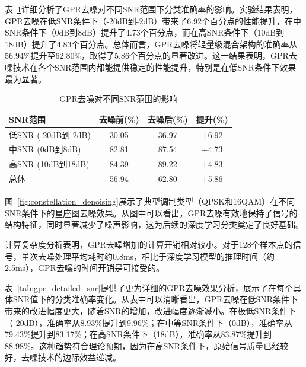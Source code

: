 \documentclass[conference]{IEEEtran}
\begin{document}
表~\ref{tab:gpr_impact}详细分析了GPR去噪对不同SNR范围下分类准确率的影响。实验结果表明，GPR去噪在低SNR条件下（-20dB到-2dB）带来了6.92个百分点的性能提升，在中SNR条件下（0dB到8dB）提升了4.73个百分点，而在高SNR条件下（10dB到18dB）提升了4.83个百分点。总体而言，GPR去噪将轻量级混合架构的准确率从56.94\%提升至62.80\%，取得了5.86个百分点的显著改进。这一结果表明，GPR去噪技术在各个SNR范围内都能提供稳定的性能提升，特别是在低SNR条件下效果最为显著。

\begin{table}[h]
\centering
\caption{GPR去噪对不同SNR范围的影响}
\label{tab:gpr_impact}
\begin{tabular}{@{}lccc@{}}
\toprule
SNR范围 & 去噪前(\%) & 去噪后(\%) & 提升(\%) \\
\midrule
低SNR (-20dB到-2dB) & 30.05 & 36.97 & +6.92 \\
中SNR (0dB到8dB) & 82.81 & 87.54 & +4.73 \\
高SNR (10dB到18dB) & 84.39 & 89.22 & +4.83 \\
总体 & 
56.94 & 62.80 & +5.86 \\
\bottomrule
\end{tabular}
\end{table}

图~\ref{fig:constellation_denoising}展示了典型调制类型（QPSK和16QAM）在不同SNR条件下的星座图去噪效果。从图中可以看出，GPR去噪有效地保持了信号的结构特征，同时显著减少了噪声影响，这为后续的深度学习分类奠定了良好基础。

计算复杂度分析表明，GPR去噪增加的计算开销相对较小。对于128个样本点的信号，单次去噪处理平均耗时约0.8ms，相比于深度学习模型的推理时间（约2.5ms），GPR去噪的时间开销是可接受的。

表~\ref{tab:gpr_detailed_snr}提供了更为详细的GPR去噪效果分析，展示了在每个具体SNR值下的分类准确率变化。从表中可以清晰看出，GPR去噪在低SNR条件下带来的改进幅度更大，随着SNR的增加，改进幅度逐渐减小。在极低SNR条件下（-20dB），准确率从8.93\%提升到9.96\%；在中等SNR条件下（0dB），准确率从79.43\%提升到83.17\%；在高SNR条件下（18dB），准确率从83.87\%提升到88.98\%。这种趋势符合理论预期，因为在高SNR条件下，原始信号质量已经较好，去噪技术的边际效益递减。
\end{document}

